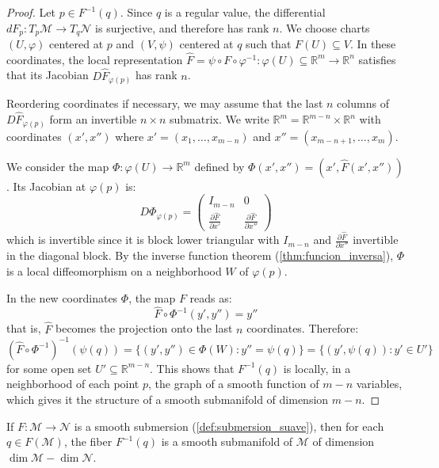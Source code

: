 \begin{proof}
Let $p \in F^{-1}(q)$. Since $q$ is a regular value, the differential $dF_p: T_p\mathcal{M} \to T_q\mathcal{N}$ is surjective, and therefore has rank $n$. We choose charts $(U, \varphi)$ centered at $p$ and $(V, \psi)$ centered at $q$ such that $F(U) \subseteq V$. In these coordinates, the local representation $\hat{F} = \psi \circ F \circ \varphi^{-1}: \varphi(U) \subseteq \mathbb{R}^m \to \mathbb{R}^n$ satisfies that its Jacobian $D\hat{F}_{\varphi(p)}$ has rank $n$.

Reordering coordinates if necessary, we may assume that the last $n$ columns of $D\hat{F}_{\varphi(p)}$ form an invertible $n \times n$ submatrix. We write $\mathbb{R}^m = \mathbb{R}^{m-n} \times \mathbb{R}^n$ with coordinates $(x', x'')$ where $x' = (x_1, \ldots, x_{m-n})$ and $x'' = (x_{m-n+1}, \ldots, x_m)$.

We consider the map $\Phi: \varphi(U) \to \mathbb{R}^m$ defined by $\Phi(x', x'') = (x', \hat{F}(x', x''))$. Its Jacobian at $\varphi(p)$ is:
\[
D\Phi_{\varphi(p)} = \begin{pmatrix} I_{m-n} & 0 \\ \frac{\partial \hat{F}}{\partial x'} & \frac{\partial \hat{F}}{\partial x''} \end{pmatrix}
\]
which is invertible since it is block lower triangular with $I_{m-n}$ and $\frac{\partial \hat{F}}{\partial x''}$ invertible in the diagonal block. By the inverse function theorem (\autoref{thm:funcion_inversa}), $\Phi$ is a local diffeomorphism on a neighborhood $W$ of $\varphi(p)$.

In the new coordinates $\Phi$, the map $F$ reads as:
\[
\hat{F} \circ \Phi^{-1}(y', y'') = y''
\]
that is, $\hat{F}$ becomes the projection onto the last $n$ coordinates. Therefore:
\[
(\hat{F} \circ \Phi^{-1})^{-1}(\psi(q)) = \{(y', y'') \in \Phi(W) : y'' = \psi(q)\} = \{(y', \psi(q)) : y' \in U'\}
\]
for some open set $U' \subseteq \mathbb{R}^{m-n}$. This shows that $F^{-1}(q)$ is locally, in a neighborhood of each point $p$, the graph of a smooth function of $m - n$ variables, which gives it the structure of a smooth submanifold of dimension $m - n$.
\end{proof}

\begin{corollary}\label{cor:fibras_submersion}
If $F: \mathcal{M} \to \mathcal{N}$ is a smooth submersion (\autoref{def:submersion_suave}), then for each $q \in F(\mathcal{M})$, the fiber $F^{-1}(q)$ is a smooth submanifold of $\mathcal{M}$ of dimension $\dim \mathcal{M} - \dim \mathcal{N}$.
\end{corollary}

